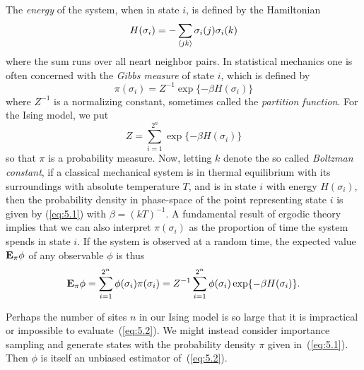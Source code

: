 The \emph{energy} of the system, when in state $i$, is defined by the Hamiltonian
\[
H(\sigma_i) = - \sum_{\langle j k\rangle} \sigma_i(j)\sigma_i(k)
\]
where the sum runs over all neart neighbor pairs. In statistical mechanics one is often concerned
with the \emph{Gibbs measure} of state $i$, which is defined by
\begin{equation}
\label{eq:5.1}
\pi(\sigma_i)= Z^{-1} \exp\{-\beta H(\sigma_i)\}
\end{equation}
where $Z^{-1}$ is a normalizing constant, sometimes called the \emph{partition function}. 
For the Ising model, we put  
\begin{equation*}
Z = \sum_{i=1}^{2^n}\exp\{-\beta H(\sigma_i)\}
\end{equation*}
so that $\pi$ is a probability measure. 
Now, letting $k$ denote the so called \emph{Boltzman constant}, if a
classical mechanical system is in thermal equilibrium with its surroundings with
absolute temperature $T$, and is in state $i$ with energy $H(\sigma_i)$, then the
probability density in phase-space of the point representing state $i$ is given by
(\ref{eq:5.1}) with $\beta = (kT)^{-1}$. A fundamental result of ergodic theory 
implies that we can also interpret $\pi(\sigma_i)$ as the proportion of time the
system spends in state $i$. If the system is observed at a random time, the
expected value $\mathbf{E}_\pi\phi$ of any observable $\phi$ is thus 
\begin{equation}
\label{eq:5.2}
\mathbf{E}_\pi\phi = 
\sum_{i=1}^{2^n}\phi(\sigma_i) \pi(\sigma_i) = 
Z^{-1}\sum_{i=1}^{2^n}\phi(\sigma_i) \exp\{-\beta H(\sigma_i)\}.
\end{equation}

Perhaps the number of sites $n$ in our Ising model is so large that it is
impractical or impossible to evaluate~(\ref{eq:5.2}).
We might instead consider importance sampling and generate states with
the probability density $\pi$ given in~(\ref{eq:5.1}).
Then $\phi$ is itself an unbiased estimator of~(\ref{eq:5.2}).

